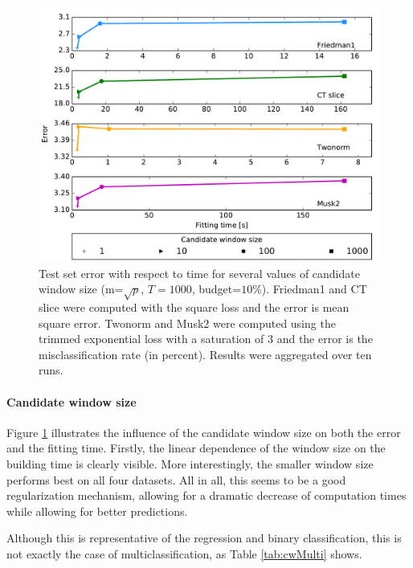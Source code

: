\documentclass{article}
\begin{document}
\begin{figure}[ht]
\begin{center}
\centerline{\includegraphics[width=\columnwidth]{cw_4}}
\caption{Test set error with respect to time for several values of candidate 
window size (m=$\sqrt{p}$, $T=1000$, budget=$10\%$). Friedman1 and CT slice 
were computed with the square loss and the error is mean square error. Twonorm 
and Musk2 were computed using the trimmed exponential loss with a saturation of 
$3$ and the error is the misclassification rate (in percent). Results were 
aggregated over ten runs.}
\label{fig:cw4}
\end{center}
\vskip -0.2in
\end{figure} 

\paragraph{Candidate window size}
Figure \ref{fig:cw4} illustrates the influence of the candidate window size on 
both the error and the fitting time. Firstly, the linear dependence of the 
window size on the building time is clearly visible. More interestingly, the 
smaller window size performs best on all four datasets. All in all, this seems 
to be a good regularization mechanism, allowing for a dramatic decrease of 
computation times while allowing for better predictions.

Although this is representative of the regression and binary classification, 
this is not exactly the case of multiclassification, as Table \ref{tab:cwMulti} 
shows.
\end{document}
